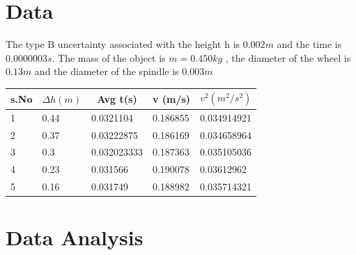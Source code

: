 \section{Data}
The type B uncertainty associated with the height h is $0.002m$ and the time is $0.0000003s$.  The mass of the object is $ m = 0.450 kg $ , the diameter of the wheel is  $ 0.13m$ and the diameter of the spindle is $ 0.003 m$

\begin{center}
\begin{tabular}{|l|l|l|l|l|}
\hline
\multicolumn{1}{|c|}{s.No} & \multicolumn{1}{c|}{$\Delta h(m)$} & \multicolumn{1}{c|}{Avg t(s)} & \multicolumn{1}{c|}{v (m/s)} & \multicolumn{1}{c|}{ $v^2 (m^2/s^2) $}\\ \hline
1                          & 0.44                                            & 0.0321104                     & 0.186855                     & 0.034914921                                                                           \\ \hline
2                          & 0.37                                            & 0.03222875                    & 0.186169                     & 0.034658964                                                                           \\ \hline
3                          & 0.3                                             & 0.032023333                   & 0.187363                     & 0.035105036                                                                           \\ \hline
4                          & 0.23                                            & 0.031566                      & 0.190078                     & 0.03612962                                                                            \\ \hline
5                          & 0.16                                            & 0.031749                      & 0.188982                     & 0.035714321                                                                           \\ \hline
\end{tabular}
\end{center}

\section{Data Analysis}

